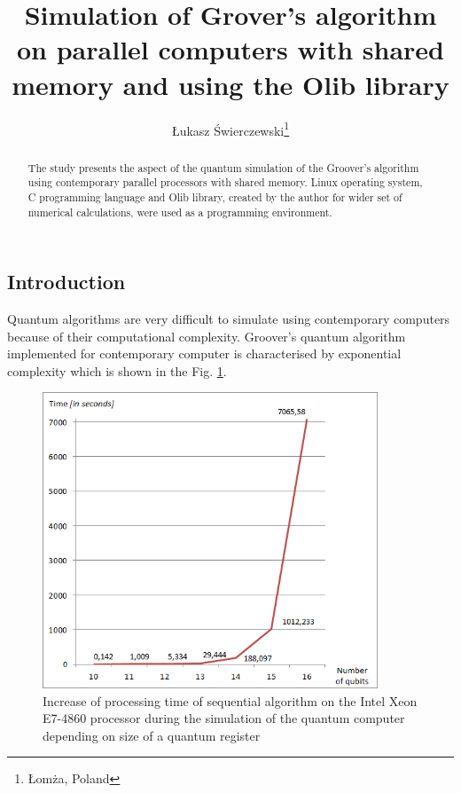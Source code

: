 \documentclass[10pt, a5paper]{article}
\begin{document}
\title{Simulation of Grover's algorithm on parallel computers with shared memory and using the Olib library}%

\author{\L{}ukasz \'{S}wierczewski\footnote{\L{}om\.z{}a, Poland}}
\maketitle

\begin{abstract}
The study presents the aspect of the quantum simulation of the Groover's algorithm using contemporary parallel processors with shared memory. Linux operating system, C programming language and Olib library, created by the author for wider set of numerical calculations, were used as a programming environment.
\end{abstract}


\subsection*{Introduction}

Quantum algorithms are very difficult to simulate using contemporary computers because of their computational complexity. Groover's quantum algorithm implemented for contemporary computer is characterised by exponential complexity which is shown in the Fig. \ref{fig:lf1}.

\begin{figure}
  \centering
  \includegraphics[width=10cm]{18_2012_1.png}
  \caption{Increase of processing time of sequential algorithm on the Intel Xeon E7-4860  processor during the simulation of the quantum computer depending on size of a quantum register}
  \label{fig:lf1}
\end{figure}
\end{document}
